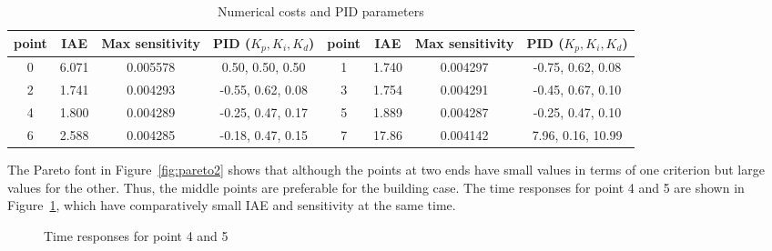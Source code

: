 \documentclass[11pt,oneside,onecolumn,openright]{article}
\begin{document}
\begin{table}[t]
  \centering
  \caption{Numerical costs and PID parameters}
    \begin{tabular}{c|ccc|c|ccc}
    \toprule
    \textbf{point} & \textbf{IAE} & \textbf{Max sensitivity} & \textbf{PID ($K_p,K_i,K_d$)} & \textbf{point} & \textbf{IAE} & \textbf{Max sensitivity} & \textbf{PID ($K_p,K_i,K_d$)} \\
    \hline
    0 & 6.071 & 0.005578 &  0.50, 0.50, 0.50 & 1 & 1.740 & 0.004297 & -0.75, 0.62, 0.08 \\
    2 & 1.741 & 0.004293 & -0.55, 0.62, 0.08 & 3 & 1.754 & 0.004291 & -0.45, 0.67, 0.10 \\
    4 & 1.800 & 0.004289 & -0.25, 0.47, 0.17 & 5 & 1.889 & 0.004287 & -0.25, 0.47, 0.10 \\
    6 & 2.588 & 0.004285 & -0.18, 0.47, 0.15 & 7 & 17.86 & 0.004142 &  7.96, 0.16, 10.99 \\
    \bottomrule
    \end{tabular}%
  \label{tab:value_build}%
\end{table}%

  The Pareto font in Figure~\ref{fig:pareto2} shows that although the points at two ends have small values in terms of one criterion but large values for the other. Thus, the middle points are preferable for the building case. The time responses for point 4 and 5 are shown in Figure~\ref{fig:resp_build}, which have comparatively small IAE and sensitivity at the same time.
   \begin{figure}[t]
  \centering
  \caption{Time responses for point 4 and 5}
  \label{fig:resp_build}
  \end{figure}
\end{document}
